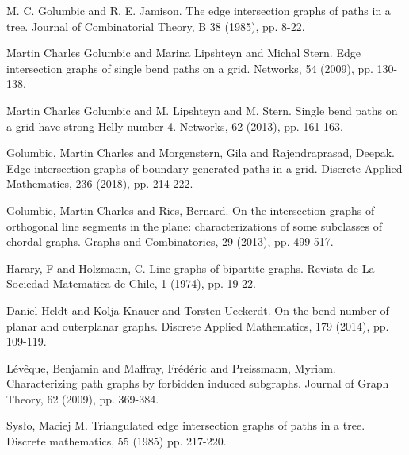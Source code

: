 \documentclass{dmgt}
\begin{document}
\begin{thebibliography}{99}
M. C. Golumbic and R. E. Jamison. The edge intersection graphs of paths in a tree. Journal of Combinatorial Theory, B 38 (1985), pp. 8-22.

Martin Charles Golumbic and Marina Lipshteyn and  Michal Stern. Edge intersection graphs of single bend paths on a grid. Networks, 54 (2009), pp. 130-138. 

Martin Charles Golumbic and M. Lipshteyn and M. Stern. Single bend paths on a grid have strong {H}elly number 4. Networks, 62 (2013), pp. 161-163.

Golumbic, Martin Charles and Morgenstern, Gila and Rajendraprasad, Deepak. Edge-intersection graphs of boundary-generated paths in a grid. Discrete Applied Mathematics, 236 (2018), pp. 214-222.

Golumbic, Martin Charles and Ries, Bernard. On the intersection graphs of orthogonal line segments in the plane: characterizations of some subclasses of chordal graphs. Graphs and Combinatorics, 29 (2013), pp. 499-517.

Harary, F and Holzmann, C. Line graphs of bipartite graphs. Revista de La Sociedad Matematica de Chile, 1 (1974), pp. 19-22.

Daniel Heldt and Kolja Knauer and Torsten Ueckerdt. On the bend-number of planar and outerplanar graphs. Discrete Applied Mathematics, 179 (2014), pp. 109-119.

  L{\'e}v{\^e}que, Benjamin and Maffray, Fr{\'e}d{\'e}ric and Preissmann, Myriam. Characterizing path graphs by forbidden induced subgraphs. Journal of Graph Theory, 62 (2009), pp. 369-384.

  Sys{\l}o, Maciej M. Triangulated edge intersection graphs of paths in a tree. Discrete mathematics,  55 (1985)  pp. 217-220.
\end{thebibliography}
\end{document}
